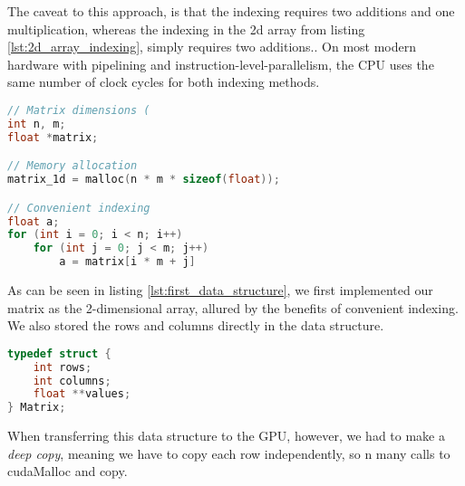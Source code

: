 The caveat to this approach, is that the indexing requires two additions and one multiplication, whereas the indexing in the 2d array from listing \ref{lst:2d_array_indexing}, simply requires two additions.\cite{numericalrecipes}. On most modern hardware with pipelining and instruction-level-parallelism, the CPU uses the same number of clock cycles for both indexing methods.%

\begin{lstlisting}[language=C, caption={Allocation and indexing of a float *}, label={lst:1d_array_indexing}]
// Matrix dimensions (
int n, m;
float *matrix;

// Memory allocation
matrix_1d = malloc(n * m * sizeof(float));

// Convenient indexing
float a;
for (int i = 0; i < n; i++)
    for (int j = 0; j < m; j++)
        a = matrix[i * m + j]
\end{lstlisting}

\noindent As can be seen in listing \ref{lst:first_data_structure}, we first implemented our matrix as the 2-dimensional array, allured by the benefits of convenient indexing. We also stored the rows and columns directly in the data structure.

\begin{lstlisting}[language=C, caption={First implementation of the matrix data structure.}, label={lst:first_data_structure}]
typedef struct {
    int rows;
    int columns;
    float **values;
} Matrix;
\end{lstlisting}

\noindent When transferring this data structure to the GPU, however, we had to make a \textit{deep copy}, meaning we have to copy each row independently, so n many calls to cudaMalloc and copy.
